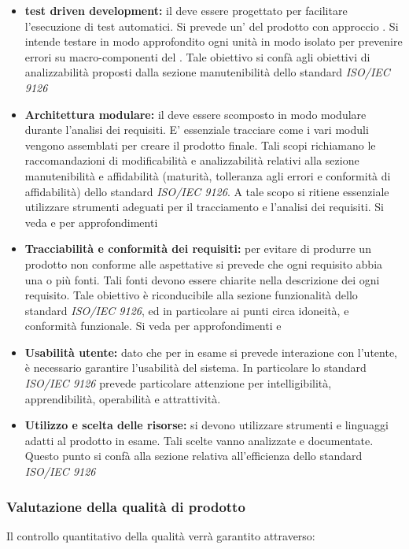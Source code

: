 \documentclass[12pt,a4paper]{article}
\begin{document}
	\begin{itemize}
		\item \textbf{test driven development:} il  deve essere progettato per facilitare l'esecuzione di test automatici. Si prevede un'  del prodotto con approccio . Si intende testare in modo approfondito ogni unità  in modo isolato per prevenire errori su macro-componenti del . Tale obiettivo si confà agli obiettivi di analizzabilità proposti dalla sezione manutenibilità dello standard \textit{ISO/IEC 9126}
		\item \textbf{Architettura modulare:} il  deve essere scomposto in modo modulare durante l'analisi dei requisiti. E' essenziale tracciare come i vari moduli vengono assemblati per creare il prodotto finale. Tali scopi richiamano le raccomandazioni di modificabilità e analizzabilità relativi alla sezione manutenibilità e affidabilità (maturità, tolleranza agli errori e conformità di affidabilità) dello standard \textit{ISO/IEC 9126}. A tale scopo si ritiene essenziale utilizzare strumenti adeguati per il tracciamento e l'analisi dei requisiti. Si veda \NdP{} e \AdR{} per approfondimenti
		\item \textbf{Tracciabilità e conformità dei requisiti:} per evitare di produrre un prodotto non conforme alle aspettative si prevede che ogni requisito  abbia una o più fonti. Tali fonti devono essere chiarite nella descrizione dei ogni requisito. Tale obiettivo è riconducibile alla sezione funzionalità dello standard \textit{ISO/IEC 9126}, ed in particolare ai punti circa idoneità, e conformità funzionale. Si veda per approfondimenti \NdP{} e \AdR{}
		\item \textbf{Usabilità utente:} dato che per  in esame si prevede interazione con l'utente, è necessario garantire l'usabilità del sistema. In particolare lo standard \textit{ISO/IEC 9126} prevede particolare attenzione per intelligibilità, apprendibilità, operabilità e attrattività.
		\item \textbf{Utilizzo e scelta delle risorse:} si devono utilizzare strumenti e linguaggi adatti al prodotto in esame. Tali scelte vanno analizzate e documentate. Questo punto si confà alla sezione relativa all'efficienza dello standard \textit{ISO/IEC 9126}
	\end{itemize}
	
	\subsubsection{Valutazione della qualità di prodotto}
	\label{sec:procedure-di-controllo-di-qualità-di-prodotto}
	Il controllo quantitativo della qualità verrà garantito attraverso:
	
\end{document}
